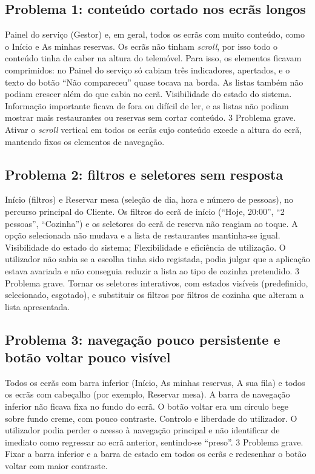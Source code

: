 \subsection{Problema 1: conteúdo cortado nos ecrãs longos}

\problema
  {Painel do serviço (Gestor) e, em geral, todos os ecrãs com muito conteúdo, como o Início e
   As minhas reservas.}
  {Os ecrãs não tinham \textit{scroll}, por isso todo o conteúdo tinha de caber na altura do
   telemóvel. Para isso, os elementos ficavam comprimidos: no Painel do serviço só cabiam três
   indicadores, apertados, e o texto do botão ``Não compareceu'' quase tocava na borda. As listas
   também não podiam crescer além do que cabia no ecrã.}
  {Visibilidade do estado do sistema.}
  {Informação importante ficava de fora ou difícil de ler, e as listas não podiam mostrar mais
   restaurantes ou reservas sem cortar conteúdo.}
  {3 \textperiodcentered{} Problema grave.}
  {Ativar o \textit{scroll} vertical em todos os ecrãs cujo conteúdo excede a altura do ecrã,
   mantendo fixos os elementos de navegação.}

\subsection{Problema 2: filtros e seletores sem resposta}

\problema
  {Início (filtros) e Reservar mesa (seleção de dia, hora e número de pessoas), no percurso
   principal do Cliente.}
  {Os filtros do ecrã de início (``Hoje, 20:00'', ``2 pessoas'', ``Cozinha'') e os seletores do
   ecrã de reserva não reagiam ao toque. A opção selecionada não mudava e a lista de restaurantes
   mantinha-se igual.}
  {Visibilidade do estado do sistema; Flexibilidade e eficiência de utilização.}
  {O utilizador não sabia se a escolha tinha sido registada, podia julgar que a aplicação estava
   avariada e não conseguia reduzir a lista ao tipo de cozinha pretendido.}
  {3 \textperiodcentered{} Problema grave.}
  {Tornar os seletores interativos, com estados visíveis (predefinido, selecionado, esgotado), e
   substituir os filtros por filtros de cozinha que alteram a lista apresentada.}

\subsection{Problema 3: navegação pouco persistente e botão voltar pouco visível}

\problema
  {Todos os ecrãs com barra inferior (Início, As minhas reservas, A sua fila) e todos os ecrãs
   com cabeçalho (por exemplo, Reservar mesa).}
  {A barra de navegação inferior não ficava fixa no fundo do ecrã. O botão voltar era um círculo
   bege sobre fundo creme, com pouco contraste.}
  {Controlo e liberdade do utilizador.}
  {O utilizador podia perder o acesso à navegação principal e não identificar de imediato como
   regressar ao ecrã anterior, sentindo-se ``preso''.}
  {3 \textperiodcentered{} Problema grave.}
  {Fixar a barra inferior e a barra de estado em todos os ecrãs e redesenhar o botão voltar com
   maior contraste.}

